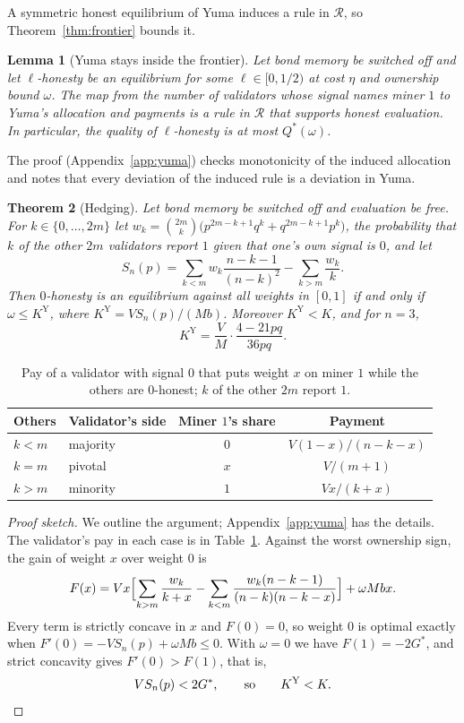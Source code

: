 \documentclass[sigconf,anonymous,review]{acmart}
\numberwithin{equation}{section}
\newtheorem{theorem}{Theorem}[section]
\newtheorem{lemma}[theorem]{Lemma}
\newcommand{\Gs}{G^{*}}
\newcommand{\KY}{K^{\mathrm{Y}}}
\newcommand{\Rset}{\mathcal{R}}
\begin{document}
A symmetric honest equilibrium of Yuma induces a rule in $\Rset$, so
Theorem~\ref{thm:frontier} bounds it.

\begin{lemma}[Yuma stays inside the frontier]\label{lem:inherit}
Let bond memory be switched off and let $\ell$-honesty be an equilibrium for
some $\ell\in[0,1/2)$ at cost $\eta$ and ownership bound $\omega$. The map from
the number of validators whose signal names miner $1$ to Yuma's allocation and
payments is a rule in $\Rset$ that supports honest evaluation. In particular,
the quality of $\ell$-honesty is at most $Q^*(\omega)$.
\end{lemma}

The proof (Appendix~\ref{app:yuma}) checks monotonicity of the induced
allocation and notes that every deviation of the induced rule is a deviation in
Yuma.

\begin{theorem}[Hedging]\label{thm:hedging}
Let bond memory be switched off and evaluation be free. For
$k\in\{0,\dots,2m\}$ let
$w_k=\binom{2m}{k}\bigl(p^{2m-k+1}q^k+q^{2m-k+1}p^k\bigr)$, the probability
that $k$ of the other $2m$ validators report $1$ given that one's own signal
is $0$, and let
\[
S_n(p)=\sum_{k<m}w_k\frac{n-k-1}{(n-k)^2}-\sum_{k>m}\frac{w_k}{k}.
\]
Then $0$-honesty is an equilibrium against all weights in $[0,1]$ if and only
if $\omega\le\KY$, where $\KY=VS_n(p)/(Mb)$. Moreover $\KY<K$, and for $n=3$,
\[
\KY=\frac VM\cdot\frac{4-21pq}{36pq}.
\]
\end{theorem}

\begin{table}[t]
\caption{Pay of a validator with signal $0$ that puts weight $x$ on miner $1$
while the others are $0$-honest; $k$ of the other $2m$ report $1$.}
\label{tab:cases}
\small
\begin{tabular}{@{}llcc@{}}
\toprule
Others & Validator's side & Miner $1$'s share & Payment \\
\midrule
$k<m$ & majority & $0$ & $V(1-x)/(n-k-x)$ \\
$k=m$ & pivotal & $x$ & $V/(m+1)$ \\
$k>m$ & minority & $1$ & $Vx/(k+x)$ \\
\bottomrule
\end{tabular}
\end{table}

\begin{proof}[Proof sketch]
We outline the argument; Appendix~\ref{app:yuma} has the details. The
validator's pay in each case is in Table~\ref{tab:cases}. Against the worst ownership sign, the gain of weight $x$ over weight $0$
is
\[
F(x)=Vx\Bigl[\sum_{k>m}\frac{w_k}{k+x}-\sum_{k<m}\frac{w_k(n-k-1)}{(n-k)(n-k-x)}\Bigr]+\omega Mbx .
\]
Every term is strictly concave in $x$ and $F(0)=0$, so weight $0$ is optimal
exactly when $F'(0)=-VS_n(p)+\omega Mb\le0$. With $\omega=0$ we have
$F(1)=-2\Gs$, and strict concavity gives $F'(0)>F(1)$, that is,
\[
VS_n(p)<2\Gs,\qquad\text{so}\qquad \KY<K.\qedhere
\]
\end{proof}
\end{document}

